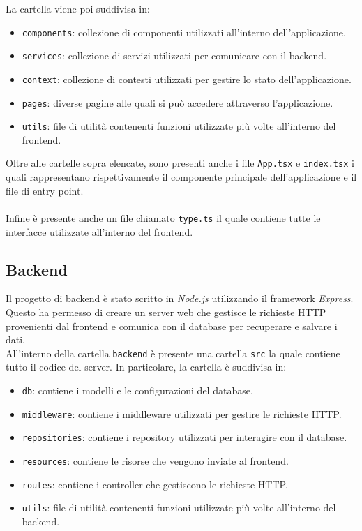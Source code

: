 \documentclass[twoside]{supsistudent}
\begin{document}
La cartella viene poi suddivisa in:

\begin{itemize}
  \item \texttt{components}: collezione di componenti utilizzati all'interno dell'applicazione.
  \item \texttt{services}: collezione di servizi utilizzati per comunicare con il backend.
  \item \texttt{context}: collezione di contesti utilizzati per gestire lo stato dell'applicazione.
  \item \texttt{pages}: diverse pagine alle quali si può accedere attraverso l'applicazione.
  \item \texttt{utils}: file di utilità contenenti funzioni utilizzate più volte all'interno del frontend.
\end{itemize}

Oltre alle cartelle sopra elencate, sono presenti anche i file \texttt{App.tsx} e \texttt{index.tsx} i quali rappresentano rispettivamente il componente principale dell'applicazione e il file di entry point.
\\\\
Infine è presente anche un file chiamato \texttt{type.ts} il quale contiene tutte le interfacce utilizzate all'interno del frontend.

\subsection{Backend}
Il progetto di backend è stato scritto in \textit{Node.js} utilizzando il framework \textit{Express}. Questo ha permesso di creare un server web che gestisce le richieste HTTP provenienti dal frontend e comunica con il database per recuperare e salvare i dati.\\

All'interno della cartella \texttt{backend} è presente una cartella \texttt{src} la quale contiene tutto il codice del server. In particolare, la cartella è suddivisa in:
\begin{itemize}
  \item \texttt{db}: contiene i modelli e le configurazioni del database.
  \item \texttt{middleware}: contiene i middleware utilizzati per gestire le richieste HTTP.
  \item \texttt{repositories}: contiene i repository utilizzati per interagire con il database.
  \item \texttt{resources}: contiene le risorse che vengono inviate al frontend.
  \item \texttt{routes}: contiene i controller che gestiscono le richieste HTTP.
  \item \texttt{utils}: file di utilità contenenti funzioni utilizzate più volte all'interno del backend.
\end{itemize}
\end{document}
